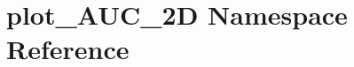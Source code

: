 \hypertarget{namespaceplot__AUC__2D}{
\section{plot\_\-AUC\_\-2D Namespace Reference}
\label{namespaceplot__AUC__2D}
}
